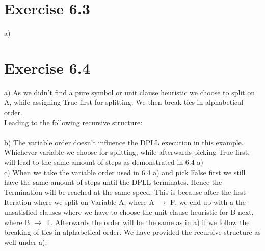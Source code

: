 \documentclass[12pt]{article}
\begin{document}
\section*{Exercise 6.3}
a) \\

\section*{Exercise 6.4}
a) As we didn't find a pure symbol or unit clause heuristic we choose to split on A, while assigning True first for splitting. We then break ties in alphabetical order.\\
Leading to the following recursive structure:\\ \\
b) The variable order doesn't influence the DPLL execution in this example. Whichever variable we choose for splitting, while afterwards picking True first, will lead to the same amount of steps as demonstrated in 6.4 a)\\
c) When we take the variable order used in 6.4 a) and pick False first we still have the same amount of steps until the DPLL terminates. Hence the Termination will be reached at the same speed. This is because after the first Iteration where we split on Variable A, where A $\to$ F, we end up with a the unsatisfied clauses where we have to choose the unit clause heuristic for B next, where B $\to$ T. Afterwards the order will be the same as in a) if we follow the breaking of ties in alphabetical order. We have provided the recursive structure as well under a).\\
\end{document}
